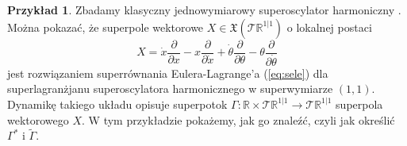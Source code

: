 \documentclass[11pt,a4paper]{report}
\theoremstyle{definition}
\newtheorem{example}[theorem]{Przykład}
\begin{document}
\begin{example}
	Zbadamy klasyczny jednowymiarowy superoscylator harmoniczny \cite{So99}. Można pokazać, że superpole wektorowe $X \in \mathfrak{X}(\mathcal{T}\mathbb{R}^{1|1})$ o lokalnej postaci
	\begin{equation*}
		X = \dot x \frac{\partial}{\partial x} - x \frac{\partial}{\partial \dot x} + \dot \theta \frac{\partial}{\partial \theta} - \theta \frac{\partial}{\partial \dot \theta}
	\end{equation*}
	jest rozwiązaniem superrównania Eulera-Lagrange'a (\ref{eq:sele}) dla superlagranżjanu superoscylatora harmonicznego w superwymiarze $(1,1)$. Dynamikę takiego układu opisuje superpotok $\Gamma: \mathbb{R} \times \mathcal{T} \mathbb{R}^{1|1} \rightarrow \mathcal{T} \mathbb{R}^{1|1}$ superpola wektorowego $X$. W tym przykładzie pokażemy, jak go znaleźć, czyli jak określić $\Gamma^*$ i $\widetilde{\Gamma}$.
					      				

\end{example}
\end{document}
